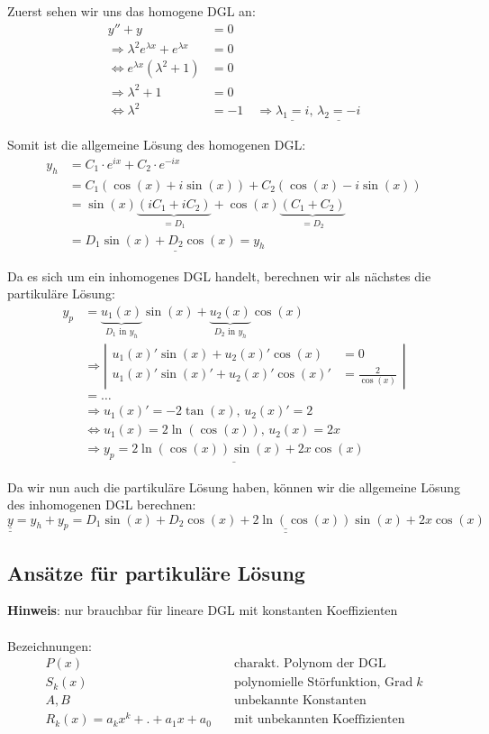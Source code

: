 Zuerst sehen wir uns das homogene DGL an:
\begin{align*}
y'' + y &= 0\\
\Rightarrow \lambda^2 e^{\lambda x} + e^{\lambda x} &= 0\\
\Leftrightarrow e^{\lambda x} (\lambda^2 + 1) &=0 \\
\Rightarrow \lambda^2 + 1 &= 0\\
\Leftrightarrow \lambda^2 &= -1 \quad
\Rightarrow \underline{\lambda_1 = i},\, \underline{\lambda_2 = -i}
\end{align*}

Somit ist die allgemeine Lösung des homogenen DGL:
\begin{align*}
y_h &= C_1 \cdot e^{ix} + C_2 \cdot e^{-ix}\\
&= C_1 (\cos(x) + i\sin(x)) + C_2(\cos(x) - i\sin(x))\\
&= \sin(x) \underbrace{(i C_1 + i C_2)}_{ = D_1} + \cos(x) \underbrace{(C_1 + C_2)}_{= D_2}\\
&= \underline{D_1 \sin(x) + D_2 \cos(x) = y_h}
\end{align*}

Da es sich um ein inhomogenes DGL handelt, berechnen wir als nächstes die partikuläre
Lösung:
\begin{align*}
y_p &= \underbrace{u_1(x)}_{D_1 \text{ in } y_h} \sin(x) + \underbrace{u_2(x)}_{D_2 \text{ in } y_h} \cos(x)\\
&\Rightarrow \left|
	\begin{aligned}
		u_1(x)' \sin(x) + u_2(x)' \cos(x) &= 0\\
		u_1(x)' \sin(x)' + u_2(x)' \cos(x)' &= \frac{2}{\cos(x)}
	\end{aligned}
\right|\\
&= \ldots\\
&\Rightarrow u_1(x)' = -2 \tan(x),\, u_2(x)' = 2\\
&\Leftrightarrow u_1(x) = 2 \ln(\cos(x)),\, u_2(x) = 2x\\
&\Rightarrow \underline{y_p = 2 \ln(\cos(x)) \sin(x) + 2x \cos(x)}
\end{align*}

Da wir nun auch die partikuläre Lösung haben, können wir die allgemeine Lösung
des inhomogenen DGL berechnen:
$\underline{\underline{y}} = y_h + y_p = \underline{\underline{D_1 \sin(x) + D_2 \cos(x) + 2 \ln(\cos(x)) \sin(x) + 2x \cos(x)}}$

\subsection{Ansätze für partikuläre Lösung}
	\textbf{Hinweis}: nur brauchbar für lineare DGL mit konstanten Koeffizienten \\
	\\
	Bezeichnungen:
	\begin{align*}
	P(x)  &  \quad \text{charakt. Polynom der DGL}  \\
	S_k(x) & \quad \text{polynomielle Störfunktion, Grad} \; k \\
	A, B & \quad \text{unbekannte Konstanten} \\
	R_k(x) = a_k x^k + . + a_1 x + a_0 & \quad \text{mit unbekannten Koeffizienten}
	\end{align*}
	
